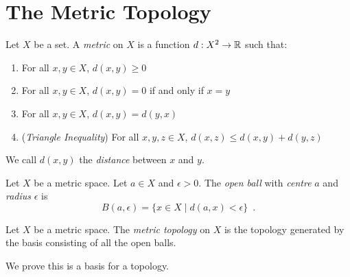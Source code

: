 
\section{The Metric Topology}

\begin{definition}[Metric]
    Let $X$ be a set. A \emph{metric} on $X$ is a function $d : X^2 \rightarrow \mathbb{R}$ such that:
    \begin{enumerate}
        \item For all $x,y \in X$, $d(x,y) \geq 0$
        \item For all $x,y \in X$, $d(x,y) = 0$ if and only if $x = y$
        \item For all $x,y \in X$, $d(x,y) = d(y,x)$
        \item (\emph{Triangle Inequality}) For all $x, y, z \in X$, $d(x,z) \leq d(x,y) + d(y,z)$
    \end{enumerate}
    We call $d(x,y)$ the \emph{distance} between $x$ and $y$.
\end{definition}

\begin{definition}
    Let $X$ be a metric space. Let $a \in X$ and $\epsilon > 0$. The \emph{open ball} with \emph{centre} $a$ and \emph{radius} $\epsilon$
    is
    \[ B(a, \epsilon) = \{ x \in X \mid d(a,x) < \epsilon \} \enspace . \]
\end{definition}

\begin{definition}
    Let $X$ be a metric space. The \emph{metric topology} on $X$ is the topology generated by the basis consisting of all the open balls.
\end{definition}

We prove this is a basis for a topology.

